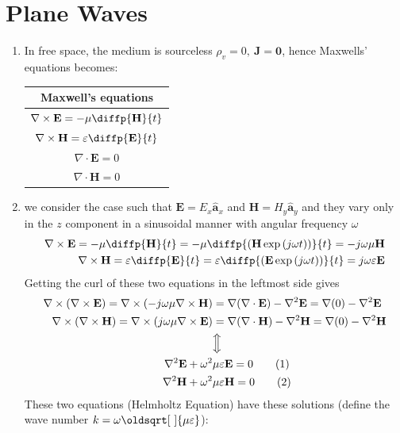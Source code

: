 \documentclass[a4paper,11pt]{article}
\newcommand\numberthis{\addtocounter{equation}{1}\tag{\theequation}}
\renewcommand*{\sqrt}[2][\ ]{\oldsqrt[#1]{#2}}
\newcommand{\grad}{\nabla}
\newcommand{\divr}{\nabla \cdot}
\newcommand{\curl}{\nabla \times}
\newcommand{\bvec}[1]{\mathbf{#1}}
\newcommand{\uvec}[1]{\hat{\mathbf{a}}_{#1} }
\begin{document}
	\section{Plane Waves}
	\begin{enumerate}
		\item In free space, the medium is sourceless $\rho_v = 0,~\bvec{J} = \bvec{0}$, hence Maxwells' equations becomes: \\
		\begin{center}
			\begin{tabular}{|c|}
				\hline
				Maxwell's equations\\ \hline
				$\curl \bvec{E} = -\mu\diffp{\bvec{H}}{t}$ \\
				$\curl \bvec{H} = \varepsilon\diffp{\bvec{E}}{t}$ \\
				$\divr \bvec{E} = 0$ \\
				$\divr \bvec{H} = 0$ \\ \hline
			\end{tabular}
		\end{center}
		\item we consider the case such that $\bvec{E} = E_x\uvec{x}$ and $\bvec{H} = H_y\uvec{y}$ and they vary only in the $z$ component in a sinusoidal manner with angular frequency $\omega$ 
		\begin{align*}
			\curl\bvec{E} = -\mu\diffp{\bvec{H}}{t} = -\mu\diffp{\left(\bvec{H}\exp \left(j\omega t\right)\right)}{t} = -j\omega\mu \bvec{H} \\
			\curl\bvec{H} = \varepsilon\diffp{\bvec{E}}{t} = \varepsilon\diffp{\left(\bvec{E}\exp \left(j\omega t\right)\right)}{t} = j\omega\varepsilon \bvec{E}
		\end{align*}
		Getting the curl of these two equations in the leftmost side gives 
		\begin{align*}
			\curl\left( \curl\bvec{E}\right) = \curl\left(-j\omega\mu\curl\bvec{H}\right) &= \grad(\divr\bvec{E}) -\grad^2\bvec{E} = \grad(0) -\grad^2\bvec{E} \\
			\curl\left( \curl\bvec{H}\right) = \curl\left(j\omega\mu\curl\bvec{E}\right) &= \grad(\divr\bvec{H}) -\grad^2\bvec{H} = \grad(0) -\grad^2\bvec{H} \\
			&\Big\Updownarrow \\
			\grad^2 \bvec{E} + \omega^2&\mu\varepsilon\bvec{E} = 0 \numberthis \\
			\grad^2 \bvec{H} + \omega^2&\mu\varepsilon\bvec{H} = 0 \numberthis
		\end{align*}
		These two equations (Helmholtz Equation) have these solutions (define the wave number $k = \omega\sqrt{\mu\varepsilon}$): 

\end{enumerate}
\end{document}
